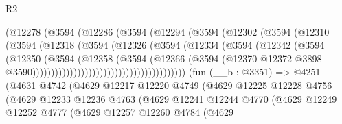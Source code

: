 \begin{lexlean}{R2}
\begin{coremodule}
                                    (@12278
                                      (@3594
                                        (@12286
                                          (@3594
                                            (@12294
                                              (@3594
                                                (@12302
                                                  (@3594
                                                    (@12310
                                                      (@3594
                                                        (@12318
                                                          (@3594
                                                            (@12326
                                                              (@3594
                                                                (@12334
                                                                  (@3594
                                                                    (@12342
                                                                      (@3594
                                                                        (@12350
                                                                          (@3594
                                                                            (@12358
                                                                              (@3594
                                                                                (@12366
                                                                                  (@3594
                                                                                    (@12370
                                                                                      @12372
                                                                                      @3898
                                                                                      @3590)))))))))))))))))))))))))))))))))))))))))
    (fun (__b : @3351) =>
    @4251
      (@4631
        @4742
        (@4629
          @12217
          @12220
          @4749
          (@4629
            @12225
            @12228
            @4756
            (@4629
              @12233
              @12236
              @4763
              (@4629
                @12241
                @12244
                @4770
                (@4629
                  @12249
                  @12252
                  @4777
                  (@4629
                    @12257
                    @12260
                    @4784
                    (@4629

\end{coremodule}
\end{lexlean}
